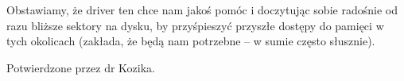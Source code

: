 Obstawiamy, że driver ten chce nam jakoś pomóc i doczytując sobie radośnie od razu bliższe sektory na dysku, by przyśpieszyć przyszłe dostępy do pamięci w tych okolicach (zakłada, że będą nam potrzebne -- w sumie często słusznie).

Potwierdzone przez dr Kozika.